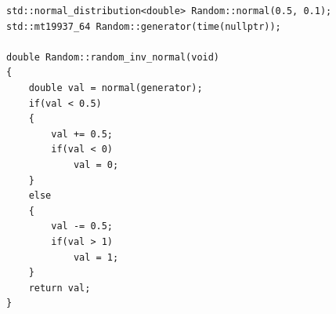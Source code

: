\begin{lstlisting}
std::normal_distribution<double> Random::normal(0.5, 0.1);
std::mt19937_64 Random::generator(time(nullptr));

double Random::random_inv_normal(void)
{
    double val = normal(generator);
    if(val < 0.5)
    {
        val += 0.5;
        if(val < 0)
            val = 0;
    }
    else
    {
        val -= 0.5;
        if(val > 1)
            val = 1;
    }
    return val;
}
\end{lstlisting}